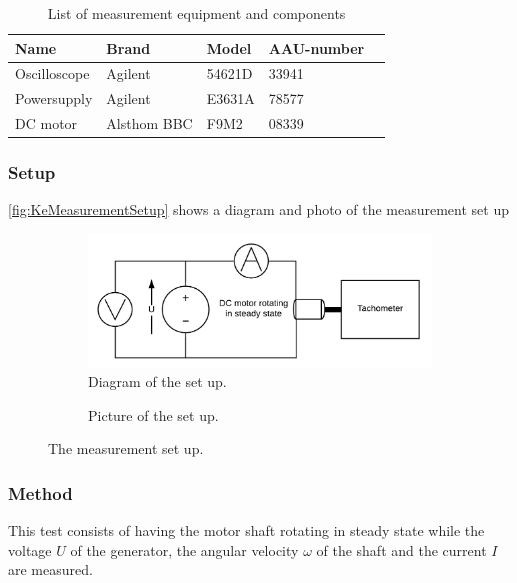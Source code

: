\begin{table}[htbp]
	\centering
	\caption{List of measurement equipment and components}\label{tab_appendix:KeSetUp}
	
	\begin{tabularx}{\textwidth}{lXXXX}
		Name 				& Brand	& Model & AAU-number									\\ \toprule \rowcolor{lightGrey}
		Oscilloscope	& Agilent & 54621D & 33941 	\\
		Powersupply	& Agilent & E3631A & 78577\\ \rowcolor{lightGrey}
		DC motor & Alsthom BBC & F9M2& 08339
	\end{tabularx}
\end{table}

\subsubsection*{Setup}
\autoref{fig:KeMeasurementSetup} shows a diagram and photo of the measurement set up
\begin{figure}[htbp]
	\centering
	\begin{subfigure}{0.50\textwidth}
		\includegraphics[width=\textwidth]{figures/appendix/Motor&GearTests/KeTestSetUp}
		\caption{Diagram of the set up.} \label{fig:KeMeasurementDiagram}
	\end{subfigure}
	\begin{subfigure}{0.40\textwidth}
		\caption{Picture of the set up.} \label{fig:KeMeasurementPictures}
	\end{subfigure}
	\caption{The measurement set up.} \label{fig:KeMeasurementSetup}   
\end{figure}

\subsubsection*{Method}
This test consists of having the motor shaft rotating in steady state while the voltage $U$ of the generator, the angular velocity $\omega$ of the shaft and the current $I$ are measured.


